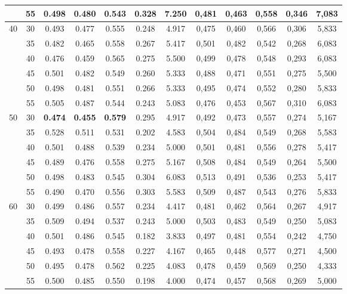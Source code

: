 \begin{table}[!h]
\begin{tabular}{|c|c||c|c|c|c|c||c|c|c|c|c|}
  & 55 & 0.498 & 0.480 & 0.543 & 0.328  & 7.250                & 0,481 & 0,463 & 0,558 & 0,346 & 7,083  \\ \hline     
 \multirow{6}{*}{40} 
  & 30 & 0.493 & 0.477 & 0.555 & 0.248  & 4.917                & 0,475 & 0,460 & 0,566 & 0,306 & 5,833  \\ \cline{2-12} 
  & 35 & 0.482 & 0.465 & 0.558 & 0.267  & 5.417                & 0,501 & 0,482 & 0,542 & 0,268 & 6,083  \\ \cline{2-12} 
  & 40 & 0.476 & 0.459 & 0.565 & 0.275  & 5.500                & 0,499 & 0,478 & 0,548 & 0,293 & 6,083  \\ \cline{2-12} 
  & 45 & 0.501 & 0.482 & 0.549 & 0.260  & 5.333                & 0,488 & 0,471 & 0,551 & 0,275 & 5,500  \\ \cline{2-12} 
  & 50 & 0.498 & 0.481 & 0.551 & 0.266  & 5.333                & 0,495 & 0,474 & 0,552 & 0,280 & 5,833  \\ \cline{2-12} 
  & 55 & 0.505 & 0.487 & 0.544 & 0.243  & 5.083                & 0,476 & 0,453 & 0,567 & 0,310 & 6,083  \\ \hline      
 \multirow{6}{*}{50} 
 & 30 & \cellcolor{gray!20} \textbf{0.474} & \cellcolor{gray!20} \textbf{0.455} & \cellcolor{gray!20} \textbf{0.579} & 0.295 & 4.917 & 0,492 & 0,473 & 0,557 & 0,274 & 5,167  \\ \cline{2-12}
  & 35 & 0.528 & 0.511 & 0.531 & 0.202  & 4.583                & 0,504 & 0,484 & 0,549 & 0,268 & 5,583  \\ \cline{2-12} 
  & 40 & 0.501 & 0.488 & 0.539 & 0.234  & 5.000                & 0,501 & 0,481 & 0,556 & 0,278 & 5,417  \\ \cline{2-12} 
  & 45 & 0.489 & 0.476 & 0.558 & 0.275  & 5.167                & 0,508 & 0,484 & 0,549 & 0,264 & 5,500  \\ \cline{2-12} 
  & 50 & 0.498 & 0.483 & 0.545 & 0.304  & 6.083                & 0,513 & 0,491 & 0,536 & 0,253 & 5,417  \\ \cline{2-12} 
  & 55 & 0.490 & 0.470 & 0.556 & 0.303  & 5.583                & 0,509 & 0,487 & 0,543 & 0,276 & 5,833  \\ \hline      
 \multirow{6}{*}{60}                           
  & 30 & 0.499 & 0.486 & 0.557 & 0.234  & 4.417                & 0,481 & 0,462 & 0,564 & 0,267 & 4,917  \\ \cline{2-12} 
  & 35 & 0.509 & 0.494 & 0.537 & 0.243  & 5.000                & 0,503 & 0,483 & 0,549 & 0,250 & 5,083  \\ \cline{2-12} 
  & 40 & 0.501 & 0.486 & 0.545 & 0.182  & 3.833                & 0,497 & 0,481 & 0,554 & 0,242 & 4,750  \\ \cline{2-12} 
  & 45 & 0.493 & 0.478 & 0.558 & 0.227  & 4.167                & 0,465 & 0,448 & 0,577 & 0,271 & 4,500  \\ \cline{2-12} 
  & 50 & 0.495 & 0.478 & 0.562 & 0.225  & 4.083                & 0,478 & 0,459 & 0,569 & 0,250 & 4,333  \\ \cline{2-12} 
  & 55 & 0.500 & 0.485 & 0.550 & 0.198  & 4.000                & 0,474 & 0,457 & 0,568 & 0,269 & 5,000  \\ \hline      


\end{tabular}
\end{table}
